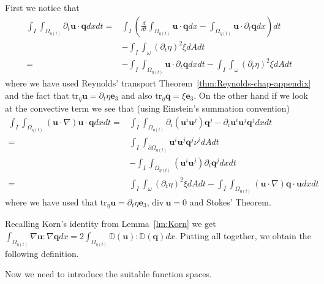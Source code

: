 \documentclass[10pt,a4paper]{article}
\numberwithin{equation}{section}
\begin{document}
First we notice that
\begin{align*}\int_{I}\int_{\Omega_{\eta\left(t\right)}}\partial_{t}\mathbf{u}\cdot\mathbf{q}dxdt= & \int_{I}\left(\frac{d}{dt}\int_{\Omega_{\eta\left(t\right)}}\mathbf{u}\cdot\mathbf{q}dx-\int_{\Omega_{\eta\left(t\right)}}\mathbf{u}\cdot\partial_{t}\mathbf{q}dx\right)dt\\
 & -\int_{I}\int_{\omega}\left(\partial_{t}\eta\right)^{2}\xi dAdt\\
= & -\int_{I}\int_{\Omega_{\eta\left(t\right)}}\mathbf{u}\cdot\partial_{t}\mathbf{q}dxdt-\int_{I}\int_{\omega}\left(\partial_{t}\eta\right)^{2}\xi dAdt
\end{align*}
 where we have  used Reynolds' transport Theorem~\ref{thm:Reynolds-chap-appendix}  and the fact that $\text{tr}_{\eta} \mathbf{u}=\partial_t\eta \mathbf{e}_{3}$ and also $\text{tr}_{\eta} \mathbf{q}= \xi \mathbf{e}_3$. On the other hand if we look at the convective term we see that (using Einstein's summation convention)
 \begin{equation}
\begin{aligned}\int_{I}\int_{\Omega_{\eta\left(t\right)}}\left(\mathbf{u}\cdot\nabla\right)\mathbf{u}\cdot\mathbf{q}dxdt= & \int_{I}\int_{\Omega_{\eta\left(t\right)}}\partial_{i}\left(\mathbf{u}^{i}\mathbf{u}^{j}\right)\mathbf{q}^{j}-\partial_{i}\mathbf{u}^{i}\mathbf{u}^{j}\mathbf{q}^{j}dxdt\\
= & \int_{I}\int_{\partial\Omega_{\eta\left(t\right)}}\mathbf{u}^{i}\mathbf{u}^{j}\mathbf{q}^{j}\nu^{i}dAdt\\
 & -\int_{I}\int_{\Omega_{\eta\left(t\right)}}\left(\mathbf{u}^{i}\mathbf{u}^{j}\right)\partial_{i}\mathbf{q}^{j}dxdt\\
= & \int_{I}\int_{\omega}\left(\partial_{t}\eta\right)^{2}\xi dAdt-\int_{I}\int_{\Omega_{\eta\left(t\right)}}\left(\mathbf{u}\cdot\nabla\right)\mathbf{q}\cdot\mathbf{u}dxdt
\end{aligned}
 \end{equation}
where we have used that $\text{tr}_{\eta}\mathbf{u}=\partial_{t}\eta\mathbf{e}_{3}$,  $\text{div} \ \mathbf{u}=0$ and Stokes' Theorem. 

Recalling  Korn's identity  from Lemma~\ref{lm:Korn} we get
$\int_{\Omega_{\eta\left(t\right)}}\nabla\mathbf{u}:\nabla\mathbf{q}dx=2\int_{\Omega_{\eta\left(t\right)}}\mathbb{D}\left(\mathbf{u}\right):\mathbb{D}\left(\mathbf{q}\right)dx$.
Putting all together,  we obtain the following definition. 

Now we need to introduce the suitable function spaces.
\end{document}

